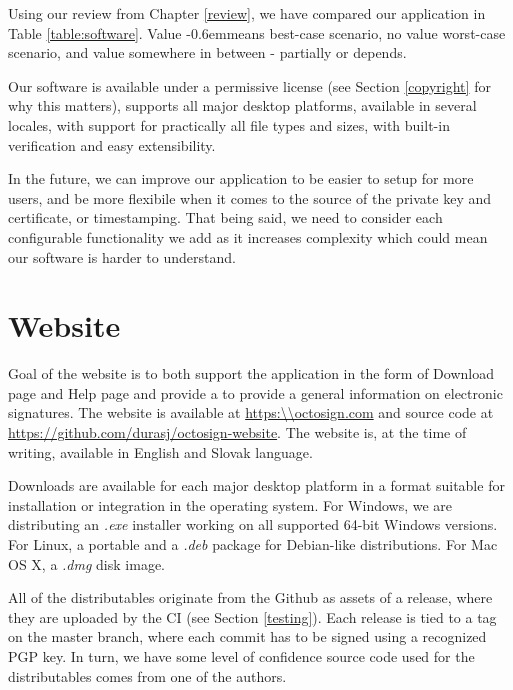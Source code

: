 \documentclass[thesismargins, english, thesislinespacing, onelinechapterstyle, upjsfrontpage]{rnthesis}
\newcommand\doublecheck{\checkmark\kern-0.6em\checkmark}
\begin{document}
Using our review from Chapter \ref{review}, we have compared our application in Table \ref{table:software}. Value \doublecheck means best-case scenario, no value worst-case scenario, and value \checkmark somewhere in between - partially or depends.

Our software is available under a permissive license (see Section \ref{copyright} for why this matters), supports all major desktop platforms, available in several locales, with support for practically all file types and sizes, with built-in verification and easy extensibility.

In the future, we can improve our application to be easier to setup for more users, and be more flexibile when it comes to the source of the private key and certificate, or timestamping.
That being said, we need to consider each configurable functionality we add as it increases complexity which could mean our software is harder to understand.

\section{Website}

Goal of the website is to both support the application in the form of Download page and Help page and provide a to provide a general information on electronic signatures.
The website is available at \url{https:\\octosign.com} and source code at \url{https://github.com/durasj/octosign-website}.
The website is, at the time of writing, available in English and Slovak language.


Downloads are available for each major desktop platform in a format suitable for installation or integration in the operating system.
For Windows, we are distributing an \textit{.exe} installer working on all supported 64-bit Windows versions.
For Linux, a portable  and a \textit{.deb} package for Debian-like distributions.
For Mac OS X, a \textit{.dmg} disk image.

All of the distributables originate from the Github as assets of a release, where they are uploaded by the CI (see Section \ref{testing}).
Each release is tied to a tag on the master branch, where each commit has to be signed using a recognized PGP key.
In turn, we have some level of confidence source code used for the distributables comes from one of the authors.
\end{document}
